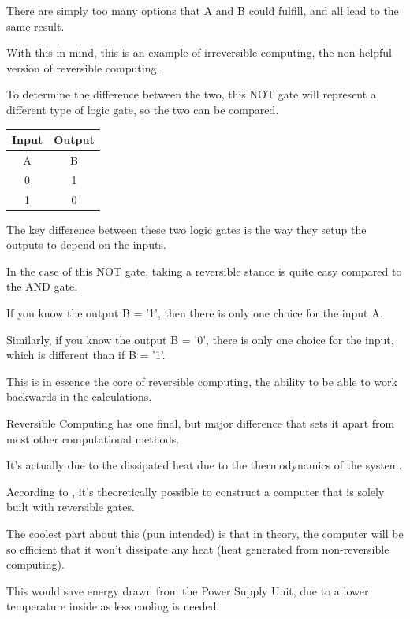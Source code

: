\documentclass{article}
\begin{document}
\medskip\noindent
There are simply too many options that A and B could fulfill, and all lead to the same result. 

\medskip\noindent
With this in mind, this is an example of irreversible computing, the non-helpful version of reversible computing. 

\medskip\noindent
To determine the difference between the two, this NOT gate will represent a different type of logic gate, so the two can be compared.  

\begin{center}
\medskip\begin{tabular}{|c c|} 
\hline
Input & Output\\ [0.5ex]
\hline
A & B\\ 
\hline\hline
0 & 1\\ 
\hline
1 & 0\\ 
\hline
\end{tabular}
\end{center}

\medskip\noindent
The key difference between these two logic gates is the way they setup the outputs to depend on the inputs. 

\medskip\noindent
In the case of this NOT gate, taking a reversible stance is quite easy compared to the AND gate.

\medskip\noindent
If you know the output B = '1', then there is only one choice for the input A.

\medskip\noindent
Similarly, if you know the output B = '0', there is only one choice for the input, which is different than if B = '1'. 

\medskip\noindent
This is in essence the core of reversible computing, the ability to be able to work backwards in the calculations.

\medskip\noindent
Reversible Computing has one final, but major difference that sets it apart from most other computational methods.

\medskip\noindent
It's actually due to the dissipated heat due to the thermodynamics of the system.

\medskip\noindent
According to \cite{RC}, it's theoretically possible to construct a computer that is solely built with reversible gates.

\medskip\noindent
The coolest part about this (pun intended) is that in theory, the computer will be so efficient that it won't dissipate any heat (heat generated from non-reversible computing). 

\medskip\noindent
This would save energy drawn from the Power Supply Unit, due to a lower temperature inside as less cooling is needed. 
\end{document}
